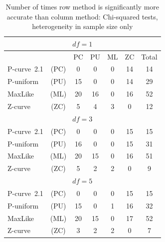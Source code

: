 \documentclass[jou]{apa6} %
\begin{document}
\begin{table} %
\caption{Number of times row method is significantly more accurate than column method: Chi-squared tests, heterogeneity in sample size only}
{\small
\begin{center}
\begin{tabular}{l c ccccc }  \hline
\multicolumn{7}{c}{$df=1$} \\ \hline
& &       PC & PU & ML & ZC & Total  \\
P-curve~2.1   & (PC)   &  0    &    0   &    0  &   14 & 14   \\
P-uniform & (PU)   & 15    &    0   &    0  &   14 & 29   \\
MaxLike   & (ML)   & 20    &   16   &    0  &   16 & 52   \\
Z-curve   & (ZC)   &  5    &    4   &    3  &    0 & 12 \\ \hline
\multicolumn{7}{c}{$df=3$} \\ \hline
P-curve~2.1   & (PC)   &  0    &    0   &    0  &   15 & 15  \\
P-uniform & (PU)   & 16    &    0   &    0  &   15 & 31   \\
MaxLike   & (ML)   & 20    &   15   &    0  &   16 & 51  \\
Z-curve   & (ZC)   &  5    &    2   &    2  &    0 &  9 \\ \hline
\multicolumn{7}{c}{$df=5$} \\ \hline
P-curve~2.1   & (PC)  &   0    &    0   &    0  &   15 & 15   \\
P-uniform & (PU)  &   15   &    0   &    1  &   16 & 32  \\
MaxLike   & (ML)  &   20   &   15   &    0  &   17 & 52  \\
Z-curve   & (ZC)  &    3   &    2   &    2  &    0 &  7   \\ \hline
\end{tabular}
\end{center}
} %
\label{heteroNchisqContest}  %
\end{table}
% 
\end{document}
